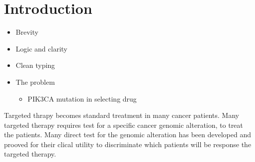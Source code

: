 \documentclass[10pt,letterpaper]{article}
\newcommand{\getIndex}[2]{
  \ForEach{,}{\IfEq{#1}{\thislevelitem}{\number\thislevelcount\ExitForEach}{}}{#2}
}
\newcommand{\getAff}[1]{
  \getIndex{#1}{}
}
\providecommand{\tightlist}{%
  \setlength{\itemsep}{0pt}\setlength{\parskip}{0pt}}
\begin{document}
\vspace*{0.2in}



\linenumbers

\hypertarget{introduction}{%
\section{Introduction}\label{introduction}}

\begin{itemize}
\item
  Brevity
\item
  Logic and clarity
\item
  Clean typing
\item
  The problem

  \begin{itemize}
  \tightlist
  \item
    PIK3CA mutation in selecting drug
  \end{itemize}
\end{itemize}

Targeted thrapy becomes standard treatment in many cancer patients. Many
targeted therapy requires test for a specific cancer genomic alteration,
to treat the patients. Many direct test for the genomic alteration has
been developed and prooved for their clical utility to discriminate
which patients will be response the targeted therapy.
\end{document}
